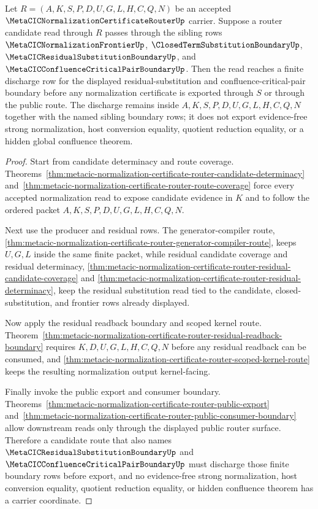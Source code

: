 \begin{theorem}
\label{thm:metacic-normalization-certificate-router-critical-pair-discharge}
Let $R=(A,K,S,P,D,U,G,L,H,C,Q,N)$ be an accepted $\MetaCICNormalizationCertificateRouterUp$ carrier. Suppose a router candidate read through $R$ passes through the sibling rows $\MetaCICNormalizationFrontierUp$, $\ClosedTermSubstitutionBoundaryUp$, $\MetaCICResidualSubstitutionBoundaryUp$, and $\MetaCICConfluenceCriticalPairBoundaryUp$. Then the read reaches a finite discharge row for the displayed residual-substitution and confluence-critical-pair boundary before any normalization certificate is exported through $S$ or through the public route. The discharge remains inside $A,K,S,P,D,U,G,L,H,C,Q,N$ together with the named sibling boundary rows; it does not export evidence-free strong normalization, host conversion equality, quotient reduction equality, or a hidden global confluence theorem.
\end{theorem}
\begin{proof}
Start from candidate determinacy and route coverage. Theorems~\ref{thm:metacic-normalization-certificate-router-candidate-determinacy} and~\ref{thm:metacic-normalization-certificate-router-route-coverage} force every accepted normalization read to expose candidate evidence in $K$ and to follow the ordered packet $A,K,S,P,D,U,G,L,H,C,Q,N$.

Next use the producer and residual rows. The generator-compiler route, \autoref{thm:metacic-normalization-certificate-router-generator-compiler-route}, keeps $U,G,L$ inside the same finite packet, while residual candidate coverage and residual determinacy, \autoref{thm:metacic-normalization-certificate-router-residual-candidate-coverage} and \autoref{thm:metacic-normalization-certificate-router-residual-determinacy}, keep the residual substitution read tied to the candidate, closed-substitution, and frontier rows already displayed.

Now apply the residual readback boundary and scoped kernel route. Theorem~\ref{thm:metacic-normalization-certificate-router-residual-readback-boundary} requires $K,D,U,G,L,H,C,Q,N$ before any residual readback can be consumed, and \autoref{thm:metacic-normalization-certificate-router-scoped-kernel-route} keeps the resulting normalization output kernel-facing.

Finally invoke the public export and consumer boundary. Theorems~\ref{thm:metacic-normalization-certificate-router-public-export} and~\ref{thm:metacic-normalization-certificate-router-public-consumer-boundary} allow downstream reads only through the displayed public router surface. Therefore a candidate route that also names $\MetaCICResidualSubstitutionBoundaryUp$ and $\MetaCICConfluenceCriticalPairBoundaryUp$ must discharge those finite boundary rows before export, and no evidence-free strong normalization, host conversion equality, quotient reduction equality, or hidden confluence theorem has a carrier coordinate.
\end{proof}

